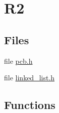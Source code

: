 \hypertarget{group___r2}{}\section{R2}
\label{group___r2}
\subsection*{Files}
\begin{DoxyCompactItemize}
\item 
file \hyperlink{pcb_8h}{pcb.\+h}
\item 
file \hyperlink{linked__list_8h}{linked\+\_\+list.\+h}
\end{DoxyCompactItemize}
\subsection*{Functions}
